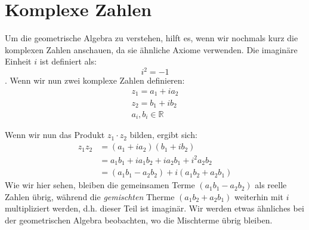 %
%
%
%
\section{Komplexe Zahlen
\label{geoalgebra:section:komplexe-zahlen}}
Um die geometrische Algebra zu verstehen, hilft es, wenn wir nochmals kurz die komplexen Zahlen anschauen, da sie ähnliche Axiome verwenden.
Die imaginäre Einheit $i$ ist definiert als:
\begin{equation}
  i^2 = -1
\end{equation}.
Wenn wir nun zwei komplexe Zahlen definieren:
\begin{align*}
  z_1 = a_1 + i a_2 \\
  z_2 = b_1 + i b_2 \\ 
  a_i, b_i \in \mathbb{R}
\end{align*}

Wenn wir nun das Produkt $z_1 \cdot{} z_2$ bilden, ergibt sich:
\begin{align*}
  z_1 z_2 &= (a_1 + i a_2) (b_1 + i b_2) \\
  &= a_1 b_1 + i a_1 b_2 + i a_2 b_1 + i^2 a_2 b_2 \\
  &= (a_1 b_1 - a_2 b_2) + i (a_1 b_2 + a_2 b_1)
\end{align*}
Wie wir hier sehen, bleiben die gemeinsamen Terme $(a_1 b_1 - a_2 b_2)$ als reelle Zahlen übrig, während die \emph{gemischten} Therme $(a_1 b_2 + a_2 b_1)$ weiterhin mit $i$
multipliziert werden, d.h. dieser Teil ist imaginär. Wir werden etwas ähnliches bei der geometrischen Algebra beobachten, wo die Mischterme übrig bleiben.




